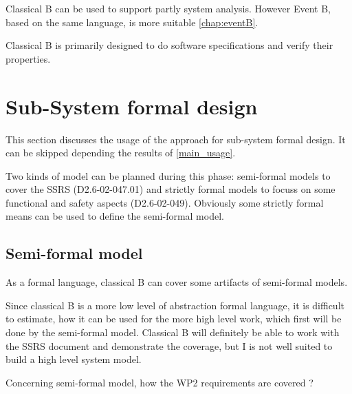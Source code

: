 \begin{author_comment}
Classical B can be used to  support partly  system analysis. However Event B, based on the same language, is more suitable \ref{chap:eventB}.
\end{author_comment}

\begin{assessor2}
Classical B is primarily designed to do software specifications and verify their properties.
\end{assessor2}

\section{Sub-System formal design}
This section discusses the usage of the approach for sub-system formal design.
It can be skipped depending the results of \ref{main_usage}.

Two kinds of model can be planned during this phase: semi-formal models to  cover the SSRS (D2.6-02-047.01) and strictly formal  models to  focuss on some functional and safety aspects (D2.6-02-049).  Obviously some strictly  formal means can be used to define the semi-formal  model.

\subsection{Semi-formal model}


\begin{author_comment}
As a formal language, classical B  can cover some artifacts of semi-formal models.
\end{author_comment}

\begin{assessor2}
Since classical B is a more low level of abstraction formal language, it is difficult to estimate, how it can be used for the more high level work, which first will be done by the semi-formal model. Classical B will definitely be able to work with the SSRS document and demonstrate the coverage, but I is not well suited to build a high level system model.
\end{assessor2}

Concerning semi-formal model, how the WP2 requirements are covered ?

